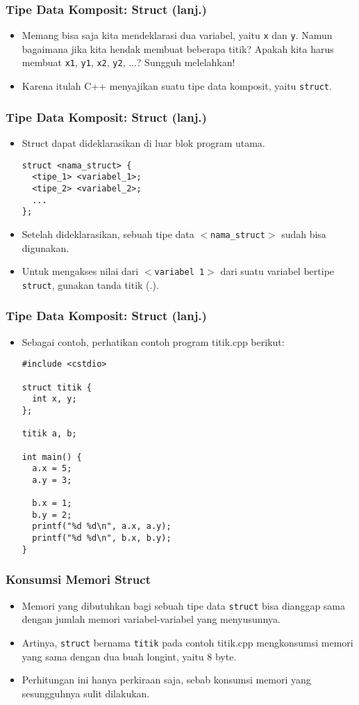 \begin{frame}
\frametitle{Tipe Data Komposit: Struct (lanj.)}
\begin{itemize}
  \item Memang bisa saja kita mendeklarasi dua variabel, yaitu \texttt{x} dan \texttt{y}. Namun bagaimana jika kita hendak membuat beberapa titik? Apakah kita harus membuat \texttt{x1}, \texttt{y1}, \texttt{x2}, \texttt{y2}, ...? Sungguh melelahkan!
  \item Karena itulah C++ menyajikan suatu tipe data komposit, yaitu \alert{\texttt{struct}}.
\end{itemize}
\end{frame}

\begin{frame}[fragile]
\frametitle{Tipe Data Komposit: Struct (lanj.)}
\begin{itemize}
  \item Struct dapat dideklarasikan di luar blok program utama.
\begin{lstlisting}
struct <nama_struct> {
  <tipe_1> <variabel_1>;
  <tipe_2> <variabel_2>;
  ...
};
\end{lstlisting}
  \item Setelah dideklarasikan, sebuah tipe data \texttt{$<$nama\_struct$>$} sudah bisa digunakan.
  \item Untuk mengakses nilai dari \texttt{$<$variabel 1$>$} dari suatu variabel bertipe \texttt{struct}, gunakan tanda titik (.).
\end{itemize}
\end{frame}

\begin{frame}[fragile]
\frametitle{Tipe Data Komposit: Struct (lanj.)}
\begin{itemize}
  \item Sebagai contoh, perhatikan contoh program titik.cpp berikut:
\begin{lstlisting}
#include <cstdio>

struct titik {
  int x, y;
};

titik a, b;

int main() {
  a.x = 5;
  a.y = 3;
  
  b.x = 1;
  b.y = 2;
  printf("%d %d\n", a.x, a.y);
  printf("%d %d\n", b.x, b.y);
}
\end{lstlisting}
\end{itemize}
\end{frame}

\begin{frame}
\frametitle{Konsumsi Memori Struct}
\begin{itemize}
  \item Memori yang dibutuhkan bagi sebuah tipe data \texttt{struct} bisa dianggap sama dengan jumlah memori variabel-variabel yang menyusunnya.
  \item Artinya, \texttt{struct} bernama \texttt{titik} pada contoh titik.cpp mengkonsumsi memori yang sama dengan dua buah longint, yaitu 8 byte.
  \item Perhitungan ini hanya perkiraan saja, sebab konsumsi memori yang sesungguhnya sulit dilakukan.
\end{itemize}
\end{frame}

